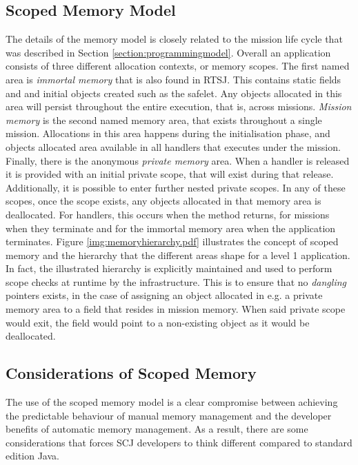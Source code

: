 \subsection{Scoped Memory Model} %
\label{sub:scoped_memory_model}
The details of the memory model is closely related to the mission life cycle that was described in Section \ref{section:programmingmodel}. Overall an application consists of three different allocation contexts, or memory scopes. The first named area is \textit{immortal memory} that is also found in RTSJ. This contains static fields and and initial objects created such as the safelet. Any objects allocated in this area will persist throughout the entire execution, that is, across missions. \textit{Mission memory} is the second named memory area, that exists throughout a single mission. Allocations in this area happens during the initialisation phase, and objects allocated area available in all handlers that executes under the mission. Finally, there is the anonymous \textit{private memory} area. When a handler is released it is provided with an initial private scope, that will exist during that release. Additionally, it is possible to enter further nested private scopes. In any of these scopes, once the scope exists, any objects allocated in that memory area is deallocated. For handlers, this occurs when the  method returns, for missions when they terminate and for the immortal memory area when the application terminates. Figure \ref{img:memoryhierarchy.pdf} illustrates the concept of scoped memory and the hierarchy that the different areas shape for a level 1 application.
In fact, the illustrated hierarchy is explicitly maintained and used to perform scope checks at runtime by the infrastructure. This is to ensure that no \textit{dangling} pointers exists, in the case of assigning an object allocated in e.g. a private memory area to a field that resides in mission memory\cite{Schoeberl:2011:MMS:2043910.2043919}. When said private scope would exit, the field would point to a non-existing object as it would be deallocated.


\subsection{Considerations of Scoped Memory} %
\label{sub:considerations_of_scoped_memory}
The use of the scoped memory model is a clear compromise between achieving the predictable behaviour of manual memory management and the developer benefits of automatic memory management. As a result, there are some considerations that forces SCJ developers to think different compared to standard edition Java.

